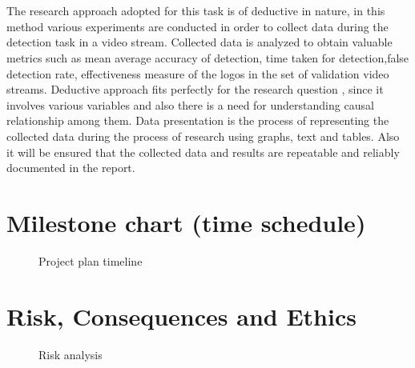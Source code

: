   \\\\
  The research approach adopted for this task is of deductive in nature, in this method various experiments are conducted in order to collect data during the detection task in a video stream. Collected data is analyzed to obtain valuable metrics such as mean average accuracy of detection, time taken for detection,false detection rate, effectiveness measure of the logos in the set of validation video streams. Deductive approach fits perfectly for the research question , since it involves various variables and also there is a need for understanding causal relationship among them.    
  Data presentation is the process of representing the collected data during the process of research using graphs, text and tables. Also it will be ensured that the collected data and results are repeatable and reliably documented in the report.  
 
\section{Milestone chart (time schedule)}
 \begin{figure}[htp] 
 \caption{Project plan timeline}
 \end{figure}

 \newpage
 \section{Risk, Consequences and Ethics}
 \begin{figure}[htp] 
 \caption{Risk analysis}\label{fig:risk}
 \end{figure}

